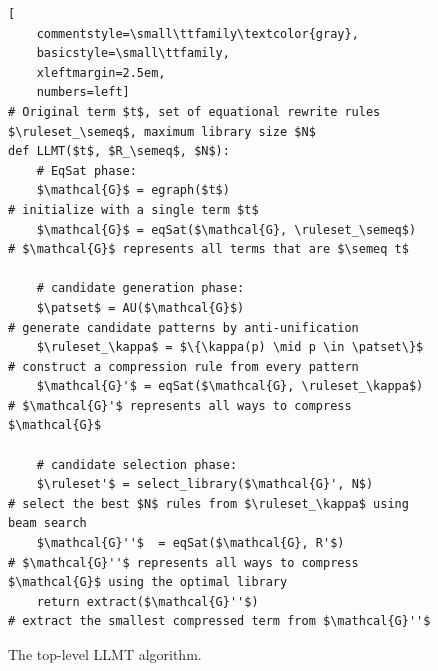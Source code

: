 \begin{figure}
\begin{lstlisting}[
    commentstyle=\small\ttfamily\textcolor{gray},
    basicstyle=\small\ttfamily,
    xleftmargin=2.5em,
    numbers=left]
# Original term $t$, set of equational rewrite rules $\ruleset_\semeq$, maximum library size $N$
def LLMT($t$, $R_\semeq$, $N$):
    # EqSat phase:
    $\mathcal{G}$ = egraph($t$)                            # initialize with a single term $t$
    $\mathcal{G}$ = eqSat($\mathcal{G}, \ruleset_\semeq$)  # $\mathcal{G}$ represents all terms that are $\semeq t$

    # candidate generation phase:
    $\patset$ = AU($\mathcal{G}$)                          # generate candidate patterns by anti-unification
    $\ruleset_\kappa$ = $\{\kappa(p) \mid p \in \patset\}$ # construct a compression rule from every pattern
    $\mathcal{G}'$ = eqSat($\mathcal{G}, \ruleset_\kappa$) # $\mathcal{G}'$ represents all ways to compress $\mathcal{G}$

    # candidate selection phase:
    $\ruleset'$ = select_library($\mathcal{G}', N$)        # select the best $N$ rules from $\ruleset_\kappa$ using beam search
    $\mathcal{G}''$  = eqSat($\mathcal{G}, R'$)            # $\mathcal{G}''$ represents all ways to compress $\mathcal{G}$ using the optimal library          
    return extract($\mathcal{G}''$)                        # extract the smallest compressed term from $\mathcal{G}''$
\end{lstlisting}
  \caption{The top-level LLMT algorithm.}
\label{fig:algo-llmt}
\end{figure}

%
